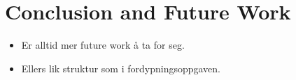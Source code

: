 \section{Conclusion and Future Work}
\begin{itemize}
    \item Er alltid mer future work å ta for seg.
    \item Ellers lik struktur som i fordypningsoppgaven.
\end{itemize}

\newpage